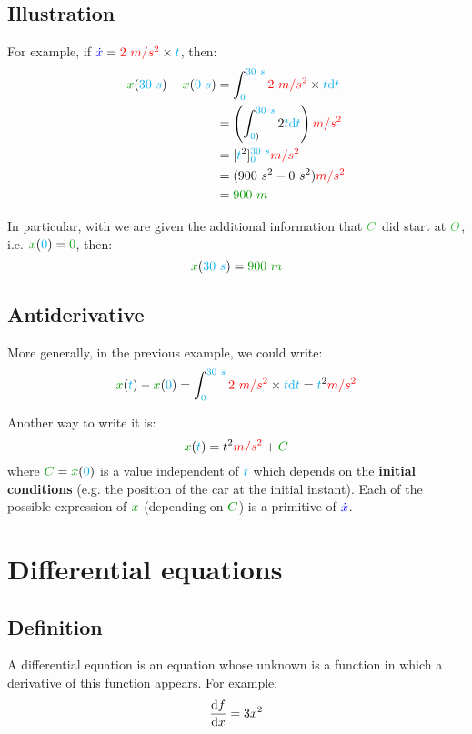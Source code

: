 \subsection{Illustration}

For example, if $\textcolor{blue}{\dot x} = \textcolor{red}{2~m/s^2} \times \textcolor{cyan}{t}$, then:
\begin{align*}
\dist{x}(\delay{30~s}) - \dist{x}(\delay{0~s})
&= \int_{\delay{0}}^{\delay{30~s}} \accel{2~m/s^2} \times \delay{t} \delay{\dt} \\
&= \left(\int_{\delay{0})}^{\delay{30~s}} 2 \delay{t} \delay{\dt}\right) \accel{m/s^2} \\
&= [\delay{t}^2]_{\delay{0}}^{\delay{30~s}} \accel{m/s^2} \\
&= (900~s^2 - 0~s^2) \accel{m/s^2} \\
&= \dist{900~m}
\end{align*}

In particular, with we are given the additional information that $\posit{C}$
did start at $\posit{O}$, i.e.  $\dist{x}(\delay{0}) = \dist{0}$, then:
\[
\dist{x}(\delay{30~s}) = \dist{900~m}
\]


\subsection{Antiderivative}

More generally, in the previous example, we could write:
\[
\dist{x}(\delay{t}) - \dist{x}(\delay{0})
= \int_{\delay{0}}^{\delay{30~s}} \accel{2~m/s^2} \times \delay{t} \delay{\dt}
= \delay{t}^2 \accel{m/s^2}
\]

Another way to write it is:
\[
\dist{x}(\delay{t})
= t^2 \accel{m/s^2} + \dist{C}
\]
where $\dist{C} = \dist{x}(\delay{0})$ is a value independent of
$\textcolor{cyan}{t}$ which depends on the \textbf{initial conditions} (e.g. the
position of the car at the initial instant). Each of the possible
expression of $\dist{x}$ (depending on $\dist{C}$) is a primitive of
$\textcolor{blue}{\dot x}$.



\section{Differential equations}


\subsection{Definition}

A differential equation is an equation whose unknown is a function in
which a derivative of this function appears. For example:
\[
\frac {\mathrm{d} f} {\mathrm{d} x} = 3x^2
\]


